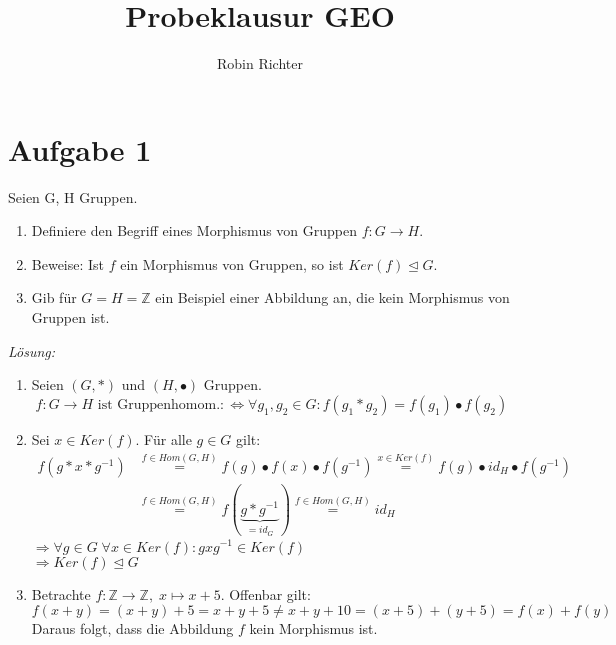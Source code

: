 \documentclass[]{scrartcl}
\title{Probeklausur GEO}
\author{Robin Richter}
\newcommand{\Z}{\mathbb{Z}}
\newcommand{\<}{\trianglelefteq}
\begin{document}
\maketitle

\section*{Aufgabe 1}
Seien G, H Gruppen.
\begin{enumerate}[label=(\alph*)]
	\item Definiere den Begriff eines Morphismus von Gruppen $f\colon G \to H$.
	\item Beweise: Ist $f$ ein Morphismus von Gruppen, so ist $Ker(f) \< G$.
	\item Gib für $G=H=\Z$ ein Beispiel einer Abbildung an, die kein Morphismus von Gruppen ist.
\end{enumerate}
\textit{Lösung:}
\begin{enumerate}[label=zu (\alph*):]
	\item Seien $(G,\ast)$ und $(H,\bullet)$ Gruppen.
		\begin{equation*}
			f\colon G \to H \text{ ist Gruppenhomom.} :\Leftrightarrow \forall g_1,g_2 \in G \colon f(g_1 \ast g_2)=f(g_1) \bullet f(g_2)
		\end{equation*}
	\item Sei $x \in Ker(f)$. Für alle $g \in G$ gilt:
		\begin{align*}
			f(g \ast x \ast g^{-1}) &\overset{f \in Hom(G,H)}{=} f(g) \bullet f(x) \bullet f(g^{-1}) \overset{x \in Ker(f)}{=} f(g) \bullet id_H \bullet f(g^{-1}) \\
			&\overset{f \in Hom(G,H)}{=} f(\underbrace{g \ast g^{-1}}_{=id_G}) \overset{f \in Hom(G,H)}{=} id_H
		\end{align*}
		$\Rightarrow \forall g \in G \; \forall x \in Ker(f)\colon gxg^{-1} \in Ker(f)$ \\
		$\Rightarrow Ker(f) \< G$
	\item Betrachte $f\colon \Z \to \Z,\; x \mapsto x+5$. Offenbar gilt:
		\begin{equation*}
			f(x+y)=(x+y)+5=x+y+5 \boldsymbol{\ne} x+y+10=(x+5)+(y+5)=f(x)+f(y)
		\end{equation*}
		Daraus folgt, dass die Abbildung $f$ kein Morphismus ist.
\end{enumerate}

\pagebreak
\end{document}
